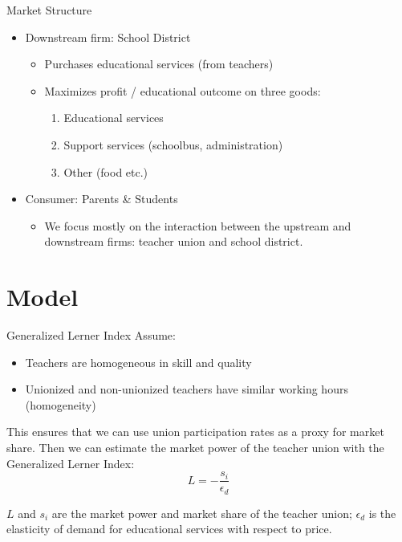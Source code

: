 \documentclass[12pt,aspectratio=169]{beamer} %
\begin{document}
\begin{frame}{Market Structure}
\begin{itemize}
	\item Downstream firm: School District
	\begin{itemize}
		\item Purchases educational services (from teachers)
		\item Maximizes profit / educational outcome on three goods:
		\begin{enumerate}
			\item Educational services
			\item Support services (schoolbus, administration)
			\item Other (food etc.)
		\end{enumerate}
	\end{itemize}
	\item Consumer: Parents \& Students
	\begin{itemize}
		\item We focus mostly on the interaction between the upstream and downstream firms: teacher union and school district.
	\end{itemize}
\end{itemize}
\end{frame}

\section{Model}

\begin{frame}{Generalized Lerner Index}
Assume:

\begin{itemize}
	\item Teachers are homogeneous in skill and quality
	\item Unionized and non-unionized teachers have similar working hours (homogeneity)
\end{itemize}

This ensures that we can use union participation rates as a proxy for market share. Then we can estimate the market power of the teacher union with the Generalized Lerner Index:
	\[
	L = -\frac{s_i}{\epsilon_d}
	\]

$L$ and $s_i$ are the market power and market share of the teacher union; $\epsilon_d$ is the elasticity of demand for educational services with respect to price.
\end{frame}
\end{document}
